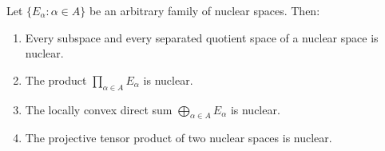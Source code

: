 Let $\{E_\alpha : \alpha \in A\}$ be an arbitrary family of nuclear spaces. Then:
\begin{enumerate}
\item Every subspace and every separated quotient space of a nuclear space is nuclear.
\item The product $\prod_{\alpha \in A} E_\alpha$ is nuclear.
\item The locally convex direct sum $\bigoplus_{\alpha \in A} E_\alpha$ is nuclear.
\item The projective tensor product of two nuclear spaces is nuclear.
\end{enumerate}
